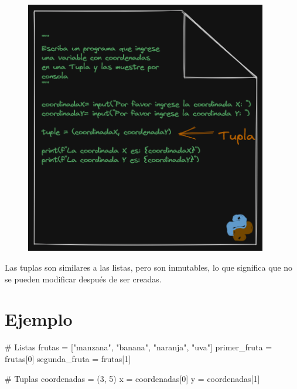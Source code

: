 \documentclass[
  a4paper,
  DIV=11,
  numbers=noendperiod,
  onepage,
  openany]{scrreprt}
\newenvironment{Shaded}{\begin{snugshade}}{\end{snugshade}}
\newcommand{\CommentTok}[1]{\textcolor[rgb]{0.37,0.37,0.37}{#1}}
\newcommand{\DecValTok}[1]{\textcolor[rgb]{0.68,0.00,0.00}{#1}}
\newcommand{\NormalTok}[1]{\textcolor[rgb]{0.00,0.23,0.31}{#1}}
\newcommand{\OperatorTok}[1]{\textcolor[rgb]{0.37,0.37,0.37}{#1}}
\newcommand{\StringTok}[1]{\textcolor[rgb]{0.13,0.47,0.30}{#1}}
\begin{document}
\begin{figure}

{\centering \includegraphics[width=4.16667in,height=\textheight]{unidades/unidad3/images/tuple.png}

}

\end{figure}

Las tuplas son similares a las listas, pero son inmutables, lo que
significa que no se pueden modificar después de ser creadas.

\section{Ejemplo}\label{ejemplo-4}

\begin{Shaded}
\begin{Highlighting}[]
\CommentTok{\# Listas}
\NormalTok{frutas }\OperatorTok{=}\NormalTok{ [}\StringTok{"manzana"}\NormalTok{, }\StringTok{"banana"}\NormalTok{, }\StringTok{"naranja"}\NormalTok{, }\StringTok{"uva"}\NormalTok{]}
\NormalTok{primer\_fruta }\OperatorTok{=}\NormalTok{ frutas[}\DecValTok{0}\NormalTok{]}
\NormalTok{segunda\_fruta }\OperatorTok{=}\NormalTok{ frutas[}\DecValTok{1}\NormalTok{]}

\CommentTok{\# Tuplas}
\NormalTok{coordenadas }\OperatorTok{=}\NormalTok{ (}\DecValTok{3}\NormalTok{, }\DecValTok{5}\NormalTok{)}
\NormalTok{x }\OperatorTok{=}\NormalTok{ coordenadas[}\DecValTok{0}\NormalTok{]}
\NormalTok{y }\OperatorTok{=}\NormalTok{ coordenadas[}\DecValTok{1}\NormalTok{]}
\end{Highlighting}
\end{Shaded}
\end{document}
